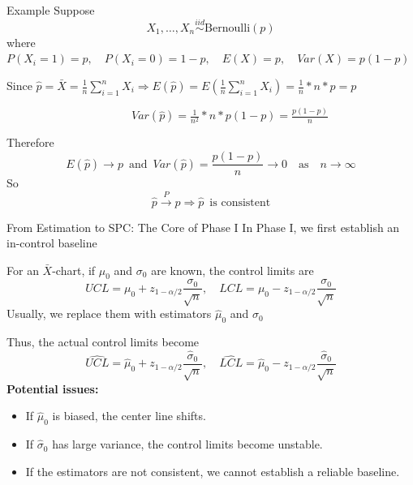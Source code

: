 \documentclass[aspectratio=169,12pt]{beamer}
\begin{document}
\begin{frame}{Example}
Suppose
\vspace{-1.2em}
$$X_1, \dots,X_n \overset{iid}{\sim}\mathrm{Bernoulli}(p)$$
where $P(X_i=1)=p, \quad P(X_i=0)=1-p, \quad E(X)=p, \quad  Var(X)=p(1-p)$

\vspace{0.8em}
Since $\hat p=\bar X=\frac1n\sum_{i=1}^n X_i\Rightarrow E(\hat p)=E(\frac1n\sum_{i=1}^n X_i)=\frac1n*n*p=p$

\vspace{0.8em}
$\qquad\qquad\qquad\qquad\qquad\quad Var(\hat{p})=\frac{1}{n^2}*n*p(1-p)=\frac{p(1-p)}{n}$

\vspace{1.2em}
Therefore
\vspace{-1.4em}
$$E(\hat p)\to p\,\,\,\text{and}\,\,\, Var(\hat p)=\frac{p(1-p)}{n}\to 0\quad \text{as}\quad n\to\infty$$
So $$\hat{p}\overset{P}{\longrightarrow}p\Rightarrow\hat{p}\,\,\, \text{is consistent}$$ 
\end{frame}

\begin{frame}{From Estimation to SPC: The Core of Phase I}
    In Phase I, we first establish an in-control baseline

    \vspace{0.5em}
    For an $\bar{X}$-chart, if $\mu_0$ and $\sigma_0$ are known, the control limits are
    $$
    UCL=\mu_0+z_{1-\alpha/2}\frac{\sigma_0}{\sqrt{n}},
    \quad
    LCL=\mu_0-z_{1-\alpha/2}\frac{\sigma_0}{\sqrt{n}}
    $$
    Usually, we replace them with estimators $\hat{\mu}_0$ and $\hat{\sigma}_0$
    
    \vspace{0.5em}
    Thus, the actual control limits become
    $$
    \widehat{UCL}=\hat{\mu}_0+z_{1-\alpha/2}\frac{\hat{\sigma}_0}{\sqrt{n}},
    \quad
    \widehat{LCL}=\hat{\mu}_0-z_{1-\alpha/2}\frac{\hat{\sigma}_0}{\sqrt{n}}
    $$
    \textbf{Potential issues:}
    \begin{itemize}
        \item If $\hat{\mu}_0$ is biased, the center line shifts.
        \item If $\hat{\sigma}_0$ has large variance, the control limits become unstable.
        \item If the estimators are not consistent, we cannot establish a reliable baseline.
    \end{itemize}
\end{frame}
\end{document}
